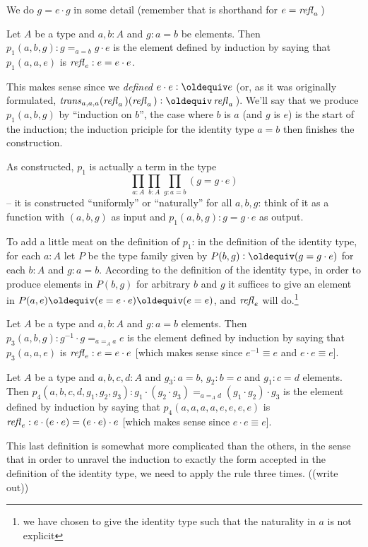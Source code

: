 We do $g=e\cdot g$ in some detail (remember that is shorthand for $e=\mathop{{\it refl}_{a}}{}$)
\begin{definition}\label{def:p1}
  Let $A$ be a type and $a, b:A$ and $g:a=b$ be elements.  Then $p_1(a,b,g):g=_{a=b}g\cdot e$ is the element defined by induction by saying that $p_1(a,a,e)$ is $\mathop{{\it refl}_{e}}:e=e\cdot e$.
\end{definition}
\begin{remark}
  This makes sense since we {\em defined} $e\cdot e\defequi e$ (or, as it was originally formulated, $\trans_{a,a,a}(\refl a{})(\refl a{})\defequi \refl a{}$).  We'll say that we produce $p_1(a,b,g)$ by ``induction on $b$'', the case where $b$ is $a$ (and $g$ is $e$) is the start of the induction; the induction priciple for the identity type $a=b$ then finishes the construction.

As constructed, $p_1$ is actually a term in the type 
$$\prod_{a:A}\prod_{b:A}\prod_{g:a=b}(g=g\cdot e)$$ -- it is constructed ``uniformly'' or ``naturally'' for all $a,b,g$: think of it as a function with $(a,b,g)$ as input and $p_1(a,b,g):g=g\cdot e$ as output.  

To add a little meat on the definition of $p_1$: in the definition of the identity type, for each $a:A$ let $P$ be the type family given by $P(b,g)\defequi (g=g\cdot e)$ for each $b:A$ and $g:a=b$.  According to the definition of the identity type, in order to produce elements in $P(b,g)$ for arbitrary $b$ and $g$ it suffices to give an element in $P(a,e)\oldequiv (e=e\cdot e)\oldequiv (e=e)$, and $\mathop{{\it refl}_{e}}$ will do.\footnote{we have chosen to give the identity type such that the naturality in $a$ is not explicit}
\end{remark}
\begin{definition}\label{def:p3}
  Let $A$ be a type and $a,b:A$ and $g:a=b$ elements.  Then $p_3(a,b,g):g^{-1}\cdot g=_{a=_Aa} e$ is the element defined by induction by saying that $p_3(a,a,e)$ is $\mathop{{\it refl}_{e}}:e=e\cdot e$ [which makes sense since $e^{-1}\equiv e$ and $e\cdot e\equiv e$].
\end{definition}
\begin{definition}\label{def:p4}
  Let $A$ be a type and $a,b,c,d:A$ and $g_3:a=b$, $g_2:b=c$ and $g_1:c=d$ elements.  Then $p_4(a,b,c,d,g_1,g_2,g_3):g_1\cdot(g_2\cdot g_3)=_{a=_Ad}(g_1\cdot g_2)\cdot g_3$ is the element defined by induction by saying that $p_4(a,a,a,a,e,e,e,e)$ is $\mathop{{\it refl}_{e}}:e\cdot(e\cdot e)=(e\cdot e)\cdot e$ [which makes sense since $e\cdot e\equiv e$].
\end{definition}
\begin{remark}
  This last definition is somewhat more complicated than the others, in the sense that in order to unravel the induction to exactly the form accepted in the definition of the identity type, we need to apply the rule three times.  ((write out))
\end{remark}

